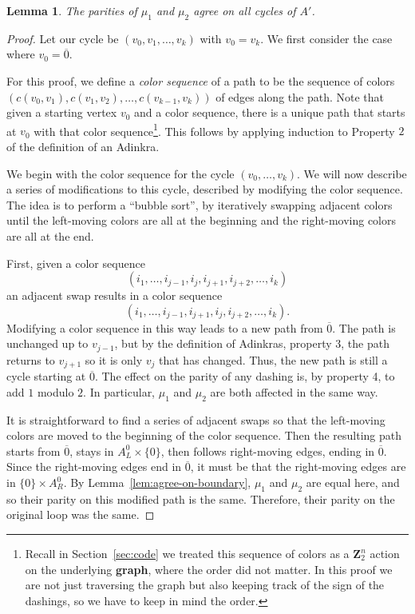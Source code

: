 \documentclass[12pt,twoside,singlespace]{article}
\numberwithin{equation}{section}
\newtheorem{lem}[equation]{Lemma}
\theoremstyle{definition}
\newcommand{\ZZ}{\mathbf{Z}}
\begin{document}
\begin{lem}
\label{lem:switch12}
The parities of $\mu_1$ and $\mu_2$ agree on all cycles of $A'$.
\end{lem}
\begin{proof}
Let our cycle be $(v_0,v_1,\ldots,v_k)$ with $v_0=v_k$.  We first consider the case where $v_0=\overline{0}$.

For this proof, we define a \emph{color sequence} of a path to be the sequence of colors $(c(v_0,v_1),c(v_1,v_2),\ldots,c(v_{k-1},v_k))$ of edges along the path.  Note that given a starting vertex $v_0$ and a color sequence, there is a unique path that starts at $v_0$ with that color sequence\footnote{Recall in Section~\ref{sec:code} we treated this sequence of colors as a $\ZZ_2^n$ action on the underlying \textbf{graph}, where the order did not matter. In this proof we are not just traversing the graph but also keeping track of the sign of the dashings, so we have to keep in mind the order.}.  This follows by applying induction to Property $2$ of the definition of an Adinkra. 

We begin with the color sequence for the cycle $(v_0,\ldots,v_k)$.  We will now describe a series of modifications to this cycle, described by modifying the color sequence.  The idea is to perform a ``bubble sort'', by iteratively swapping adjacent colors until the left-moving colors are all at the beginning and the right-moving colors are all at the end.

First, given a color sequence
\[(i_1,\ldots,i_{j-1},i_j,i_{j+1},i_{j+2},\ldots,i_k)\]
an adjacent swap results in a color sequence
\[(i_1,\ldots,i_{j-1},i_{j+1},i_j,i_{j+2},\ldots,i_k).\]
Modifying a color sequence in this way leads to a new path from $\overline{0}$.  The path is unchanged up to $v_{j-1}$, but by the definition of Adinkras, property 3, the path returns to $v_{j+1}$ so it is only $v_j$ that has changed.  Thus, the new path is still a cycle starting at $\overline{0}$.  The effect on the parity of any dashing is, by property 4, to add $1$ modulo $2$.  In particular, $\mu_1$ and $\mu_2$ are both affected in the same way.

It is straightforward to find a series of adjacent swaps so that the left-moving colors are moved to the beginning of the color sequence.  Then the resulting path starts from $\overline{0}$, stays in $A_L^0\times\{0\}$, then follows right-moving edges, ending in $\overline{0}$.  Since the right-moving edges end in $\overline{0}$, it must be that the right-moving edges are in $\{0\}\times A_R^0$.  By Lemma~\ref{lem:agree-on-boundary}, $\mu_1$ and $\mu_2$ are equal here, and so their parity on this modified path is the same.  Therefore, their parity on the original loop was the same.


\end{proof}
\end{document}
